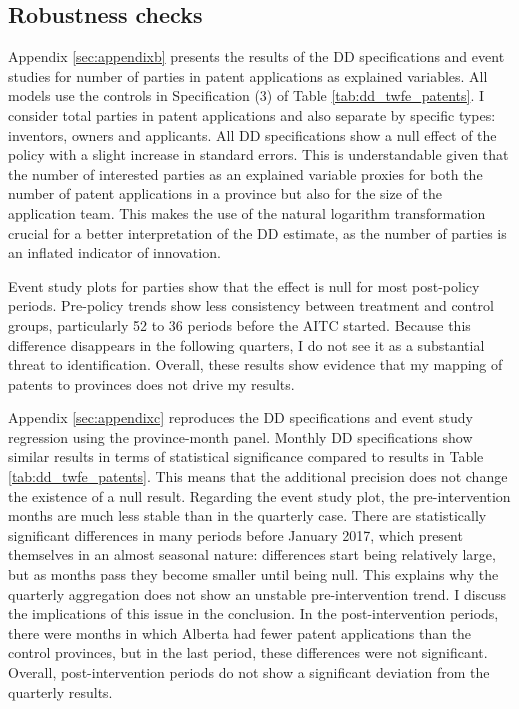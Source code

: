 \documentclass[../main.tex]{subfiles}
\begin{document}
\subsection{Robustness checks}

Appendix \ref{sec:appendixb} presents the results of the DD specifications and event studies for number of parties in patent applications as explained variables. All models use the controls in Specification (3) of Table \ref{tab:dd_twfe_patents}. I consider total parties in patent applications and also separate by specific types: inventors, owners and applicants. All DD specifications show a null effect of the policy with a slight increase in standard errors. This is understandable given that the number of interested parties as an explained variable proxies for both the number of patent applications in a province but also for the size of the application team. This makes the use of the natural logarithm transformation crucial for a better interpretation of the DD estimate, as the number of parties is an inflated indicator of innovation. 

Event study plots for parties show that the effect is null for most post-policy periods. Pre-policy trends show less consistency between treatment and control groups, particularly 52 to 36 periods before the AITC started. Because this difference disappears in the following quarters, I do not see it as a substantial threat to identification. Overall, these results show evidence that my mapping of patents to provinces does not drive my results.

Appendix \ref{sec:appendixc} reproduces the DD specifications and event study regression using the province-month panel. Monthly DD specifications show similar results in terms of statistical significance compared to results in Table \ref{tab:dd_twfe_patents}. This means that the additional precision does not change the existence of a null result. Regarding the event study plot, the pre-intervention months are much less stable than in the quarterly case. There are statistically significant differences in many periods before January 2017, which present themselves in an almost seasonal nature: differences start being relatively large, but as months pass they become smaller until being null. This explains why the quarterly aggregation does not show an unstable pre-intervention trend. I discuss the implications of this issue in the conclusion. In the post-intervention periods, there were months in which Alberta had fewer patent applications than the control provinces, but in the last period, these differences were not significant. Overall, post-intervention periods do not show a significant deviation from the quarterly results.
\end{document}
